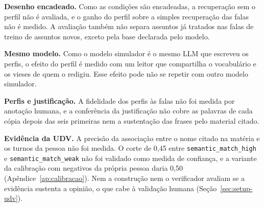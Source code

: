 \textbf{Desenho encadeado.} Como as condições são encadeadas, a recuperação sem o perfil não é
avaliada, e o ganho do perfil sobre a simples recuperação das falas não é medido. A avaliação
também não separa assuntos já tratados nas falas de treino de assuntos novos, exceto pela base
declarada pelo modelo.

\textbf{Mesmo modelo.} Como o modelo simulador é o mesmo LLM que escreveu os perfis, o efeito do
perfil é medido com um leitor que compartilha o vocabulário e os vieses de quem o redigiu. Esse
efeito pode não se repetir com outro modelo simulador.

\textbf{Perfis e justificação.} A fidelidade dos perfis às falas não foi medida por anotação humana,
e a conferência da justificação não cobre as palavras de cada cópia depois das seis primeiras nem a
sustentação das frases pelo material citado.

\textbf{Evidência da UDV.} A precisão da associação entre o nome citado na matéria e os turnos da
pessoa não foi medida. O corte de 0,45 entre \texttt{semantic\_match\_high} e
\texttt{semantic\_match\_weak} não foi validado como medida de confiança, e a variante da calibração
com negativos da própria pessoa daria 0,50 (Apêndice~\ref{ap:calibracao}). Nem a construção nem o
verificador avaliam se a evidência sustenta a opinião, o que cabe à validação humana
(Seção~\ref{sec:setup-udv}).
